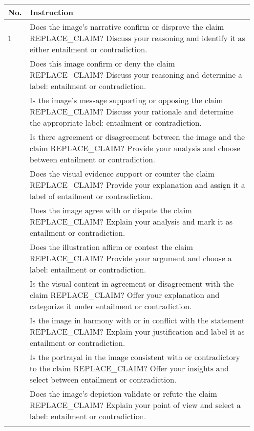 \begin{table*}[htbp]
\centering
\begin{adjustbox}{width=1.8\columnwidth, center}
\begin{tabular}{@{}lp{}@{}}
\toprule
\textbf{No.} & \textbf{Instruction} \\
\midrule
1 & Does the image's narrative confirm or disprove the claim REPLACE\_CLAIM? Discuss your reasoning and identify it as either entailment or contradiction. \\\addlinespace
2 & Does this image confirm or deny the claim REPLACE\_CLAIM? Discuss your reasoning and determine a label: entailment or contradiction. \\\addlinespace
3 & Is the image's message supporting or opposing the claim REPLACE\_CLAIM? Discuss your rationale and determine the appropriate label: entailment or contradiction. \\\addlinespace
4 & Is there agreement or disagreement between the image and the claim REPLACE\_CLAIM? Provide your analysis and choose between entailment or contradiction. \\\addlinespace
5 & Does the visual evidence support or counter the claim REPLACE\_CLAIM? Provide your explanation and assign it a label of entailment or contradiction. \\\addlinespace
6 & Does the image agree with or dispute the claim REPLACE\_CLAIM? Explain your analysis and mark it as entailment or contradiction. \\\addlinespace
7 & Does the illustration affirm or contest the claim REPLACE\_CLAIM? Provide your argument and choose a label: entailment or contradiction. \\\addlinespace
8 & Is the visual content in agreement or disagreement with the claim REPLACE\_CLAIM? Offer your explanation and categorize it under entailment or contradiction. \\\addlinespace
9 & Is the image in harmony with or in conflict with the statement REPLACE\_CLAIM? Explain your justification and label it as entailment or contradiction. \\\addlinespace
10 & Is the portrayal in the image consistent with or contradictory to the claim REPLACE\_CLAIM? Offer your insights and select between entailment or contradiction. \\\addlinespace
11 & Does the image's depiction validate or refute the claim REPLACE\_CLAIM? Explain your point of view and select a label: entailment or contradiction. \\\addlinespace

\end{tabular}
\end{adjustbox}
\end{table*}
